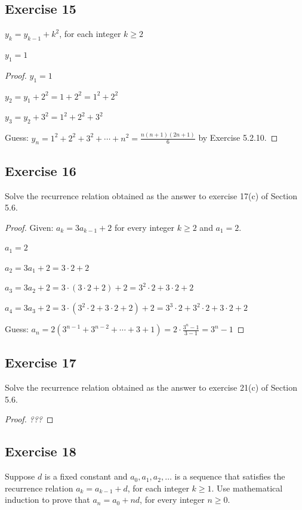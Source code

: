 \documentclass[14pt]{extarticle}
\newcommand{\dps}{\displaystyle}
\newcommand{\cy}{\color{cyan}}
\begin{document}
\subsection{Exercise 15}
\(y_k = y_{k-1} + k^2\), for each integer \(k \geq 2\)

\(y_1 = 1\)

\begin{proof}
\(y_1 = 1\)

\(y_2 = y_1 + 2^2 = 1 + 2^2 = 1^2 + 2^2\)

\(y_3 = y_2 + 3^2 = 1^2 + 2^2 + 3^2\)

Guess: \(y_n = 1^2 + 2^2 + 3^2 + \cdots + n^2 = \dps \frac{n(n+1)(2n+1)}{6}\) {\cy by Exercise 5.2.10}.
\end{proof}

\subsection{Exercise 16}
Solve the recurrence relation obtained as the answer to exercise 17(c) of Section 5.6.

\begin{proof}
Given: \(a_k = 3a_{k-1} + 2\) for every integer \(k \geq 2\) and \(a_1 = 2\).

\(a_1 = 2\)

\(a_2 = 3a_1 + 2 = 3 \cdot 2 + 2\)

\(a_3 = 3a_2 + 2 = 3 \cdot (3 \cdot 2 + 2) + 2 = 3^2 \cdot 2 + 3 \cdot 2 + 2\)

\(a_4 = 3a_3 + 2 = 3 \cdot (3^2 \cdot 2 + 3 \cdot 2 + 2) + 2 = 3^3 \cdot 2 + 3^2 \cdot 2 + 3 \cdot 2 + 2\)

Guess: \(a_n = 2(3^{n-1} + 3^{n-2} + \cdots + 3 + 1) = \dps 2 \cdot \frac{3^n - 1}{3 - 1} = 3^n - 1\)
\end{proof}

\subsection{Exercise 17}
Solve the recurrence relation obtained as the answer to exercise 21(c) of Section 5.6.

\begin{proof}
{\it ???}
\end{proof}

\subsection{Exercise 18}
Suppose $d$ is a fixed constant and \(a_0, a_1, a_2, \ldots\) is a sequence that satisfies the recurrence 
relation \(a_k = a_{k-1} + d\), for each integer \(k \geq 1\). Use mathematical induction to prove that 
\(a_n = a_0 + nd\), for every integer \(n \geq 0\).
\end{document}
